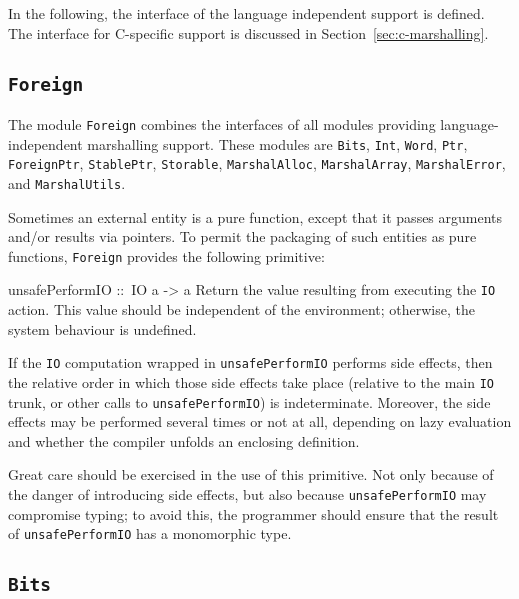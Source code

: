 \documentclass[a4paper,twoside]{article}
\makeatletter
\newcommand{\code}[1]{\texttt{#1}}      %
\newenvironment{codedesc}{%
  \list{}{\labelwidth\z@
    \let\makelabel\codedesclabel}
  }{%
  \endlist
  }
\newcommand*{\codedesclabel}[1]{%
  \hspace{-\leftmargin}
  \parbox[b]{\labelwidth}{\makebox[0pt][l]{\code{#1}}\\}\hfil\relax
  }
\makeatother
\begin{document}
In the following, the interface of the language independent support is
defined.  The interface for C-specific support is discussed in
Section~\ref{sec:c-marshalling}. 

\subsection{\code{Foreign}}
\label{sec:Foreign}

The module \code{Foreign} combines the interfaces of all modules providing
language-independent marshalling support.  These modules are \code{Bits},
\code{Int}, \code{Word}, \code{Ptr}, \code{ForeignPtr}, \code{StablePtr},
\code{Storable}, \code{MarshalAlloc}, \code{MarshalArray},
\code{MarshalError}, and \code{MarshalUtils}.

Sometimes an external entity is a pure function, except that it passes
arguments and/or results via pointers.  To permit the packaging of
such entities as pure functions, \code{Foreign} provides the following
primitive:
%
\begin{codedesc}
\item[unsafePerformIO ::\ IO a -> a] Return the value resulting from executing
  the \code{IO} action.  This value should be independent of the environment;
  otherwise, the system behaviour is undefined.
  
  If the \code{IO} computation wrapped in \code{unsafePerformIO} performs side
  effects, then the relative order in which those side effects take place
  (relative to the main \code{IO} trunk, or other calls to
  \code{unsafePerformIO}) is indeterminate.  Moreover, the side effects may be
  performed several times or not at all, depending on lazy evaluation and
  whether the compiler unfolds an enclosing definition.
  
  Great care should be exercised in the use of this primitive.  Not only
  because of the danger of introducing side effects, but also because
  \code{unsafePerformIO} may compromise typing; to avoid this, the programmer
  should ensure that the result of \code{unsafePerformIO} has a monomorphic
  type.
\end{codedesc}

\subsection{\code{Bits}}
\end{document}
